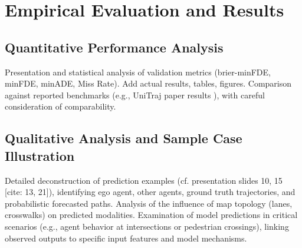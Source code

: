 
\chapter{Empirical Evaluation and Results}
\label{ch:results_evaluation}

\section{Quantitative Performance Analysis}
\label{sec:results_quantitative}
Presentation and statistical analysis of validation metrics (brier-minFDE, minFDE, minADE, Miss Rate). Add actual results, tables, figures.
Comparison against reported benchmarks (e.g., UniTraj paper results ), with careful consideration of comparability.

\section{Qualitative Analysis and Sample Case Illustration}
\label{sec:results_qualitative}
Detailed deconstruction of prediction examples (cf. presentation slides 10, 15 [cite: 13, 21]), identifying ego agent, other agents, ground truth trajectories, and probabilistic forecasted paths. Analysis of the influence of map topology (lanes, crosswalks) on predicted modalities.
Examination of model predictions in critical scenarios (e.g., agent behavior at intersections or pedestrian crossings), linking observed outputs to specific input features and model mechanisms.
